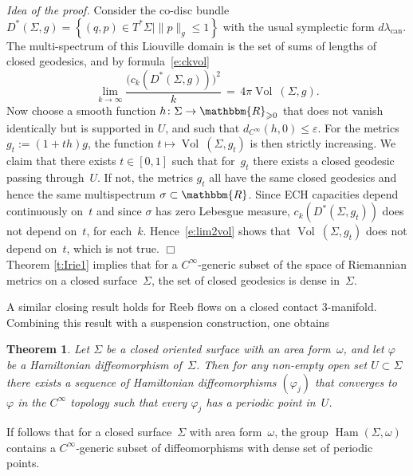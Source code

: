 \documentclass[12pt,twoside]{amsart}
\theoremstyle{plain}
\newtheorem{theorem}{Theorem}[section]
\numberwithin{figure}{section}
\numberwithin{equation}{section}
\newcommand{\proofend}{\hspace*{\fill} $\Box$\\}
\def\m{\medskip}
\def\Vol{\operatorname {Vol}\:\!}
\def\Ham{\operatorname{Ham}}
\def\can{\operatorname{can}}
\def\gve{\varepsilon}
\def\gf{\varphi}
\def\go{\omega}
\def\RR{\mathbbm{R}}
\def\ni{\noindent}
\def\m{\medskip}
\begin{document}
\m \ni
{\it Idea of the proof.}
Consider the co-disc bundle 
$D^* (\Sigma,g) = \left\{ (q,p) \in T^*\Sigma \mid \|p\|_g \leqslant 1 \right\}$
with the usual symplectic form $d \lambda_{\can}$.
The multi-spectrum of this Liouville domain is the set of sums of lengths of closed geodesics, 
and by formula~\eqref{e:ckvol}
%
\begin{equation} \label{e:lim2vol}
\lim_{k \to \infty} \frac{\bigl( c_k(D^*(\Sigma,g)) \bigr)^2}{k} \,=\, 4 \pi \Vol (\Sigma, g) .
\end{equation} 
%
Now choose a smooth function $h \colon \Sigma \to \RR_{\geqslant 0}$ that does not vanish identically
but is supported in $U$, and such that $d_{C^\infty}(h,0) \leqslant \gve$.
For the metrics $g_t := (1+th)g$,
the function $t \mapsto \Vol (\Sigma, g_t)$ is then strictly increasing.
%
We claim that there exists $t \in [0,1]$ such that for~$g_t$
there exists a closed geodesic passing through~$U$.
If not, the metrics $g_t$ all have the same closed geodesics and hence the same multispectrum $\sigma \subset \RR$. 
Since ECH capacities depend continuously on~$t$ and since $\sigma$ has zero Lebesgue measure, 
$c_k(D^* (\Sigma,g_t))$ does not depend on~$t$, for each~$k$. 
Hence~\eqref{e:lim2vol} shows that $\Vol (\Sigma,g_t)$ does not depend on~$t$, which is not true. 
\proofend

Theorem \ref{t:Irie1} implies that for a $C^\infty$-generic subset of the space of Riemannian metrics on a closed surface~$\Sigma$, 
the set of closed geodesics is dense in~$\Sigma$.

A similar closing result holds for Reeb flows on a closed contact 3-manifold.
%
Combining this result with a suspension construction, one obtains

\begin{theorem} \label{t:closing}
Let $\Sigma$ be a closed oriented surface with an area form~$\go$,
and let $\gf$ be a Hamiltonian diffeomorphism of~$\Sigma$.
Then for any non-empty open set $U \subset \Sigma$ there exists a sequence of Hamiltonian diffeomorphisms
$(\gf_j)$ that converges to~$\gf$ in the $C^\infty$ topology 
such that every $\gf_j$ has a periodic point in~$U$.
\end{theorem}

If follows that for a closed surface~$\Sigma$ with area form~$\go$,
the group $\Ham (\Sigma,\go)$ contains a $C^\infty$-generic subset of diffeomorphisms with dense set of periodic points.
\end{document}
